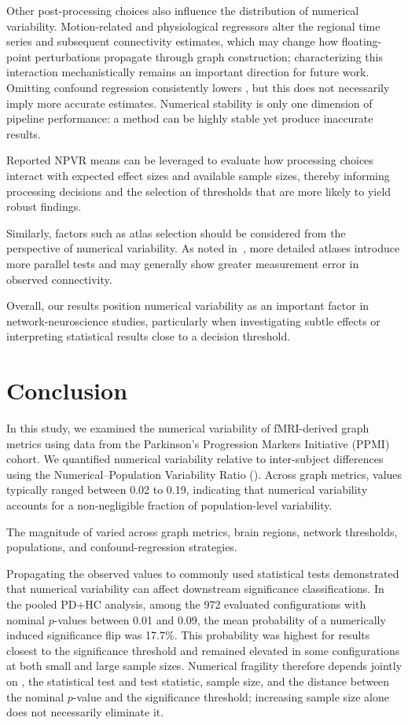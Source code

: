 Other post-processing choices also influence the distribution of numerical variability.
Motion-related and physiological regressors alter the regional time series and subsequent connectivity estimates, which may change how floating-point perturbations propagate through graph construction; characterizing this interaction mechanistically remains an important direction for future work.
Omitting confound regression consistently lowers \npvratio{}, but this does not necessarily imply more accurate estimates. Numerical stability is only one dimension of pipeline performance: a method can be highly stable yet produce inaccurate results. 

Reported NPVR means can be leveraged to evaluate how processing choices interact with expected effect sizes and available sample sizes, thereby informing processing decisions and the selection of thresholds that are more likely to yield robust findings.

Similarly, factors such as atlas selection should be considered from the perspective of numerical variability. As noted in~\cite{Helwegen2023Statisticalpower}, more detailed atlases introduce more parallel tests and may generally show greater measurement error in observed connectivity.

Overall, our results position numerical variability as an important factor in
network-neuroscience studies, particularly when investigating subtle effects
or interpreting statistical results close to a decision threshold.

\section{Conclusion}

In this study, we examined the numerical variability of fMRI-derived graph
metrics using data from the Parkinson's Progression Markers Initiative (PPMI)
cohort. We quantified numerical variability relative to inter-subject
differences using the Numerical--Population Variability Ratio (\npvratio{}).
Across graph metrics, \npvratio{} values typically ranged between 0.02 to 0.19,
indicating that numerical variability accounts for a non-negligible fraction
of population-level variability.

The magnitude of \npvratio{} varied across graph metrics, brain regions,
network thresholds, populations, and confound-regression strategies.

Propagating the observed \npvratio{} values to commonly used statistical
tests demonstrated that numerical variability can affect downstream
significance classifications. In the pooled PD+HC analysis, among the 972
evaluated configurations with nominal \(p\)-values between 0.01 and 0.09, the
mean probability of a numerically induced significance flip was 17.7\%. This
probability was highest for results closest to the significance threshold and
remained elevated in some configurations at both small and large sample sizes.
Numerical fragility therefore depends jointly on \npvratio{}, the statistical
test and test statistic, sample size, and the distance between the nominal
\(p\)-value and the significance threshold; increasing sample size alone does
not necessarily eliminate it.

